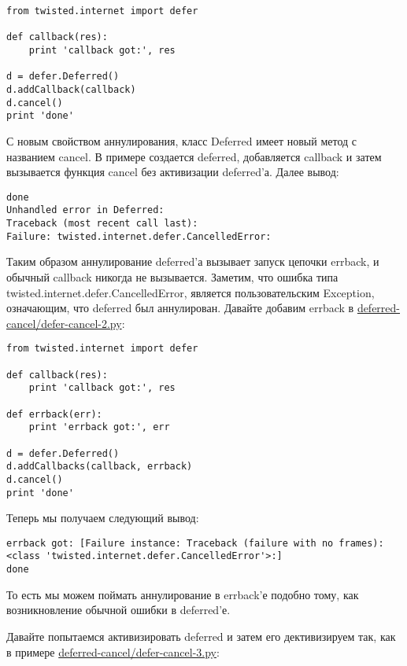  \begin{verbatim}
from twisted.internet import defer

def callback(res):
    print 'callback got:', res

d = defer.Deferred()
d.addCallback(callback)
d.cancel()
print 'done'
\end{verbatim} 


С новым свойством аннулирования, класс Deferred имеет новый 
метод с названием cancel. В примере создается deferred, 
добавляется callback и затем вызывается функция cancel без 
активизации deferred'а.  Далее вывод:

 \begin{verbatim}
done
Unhandled error in Deferred:
Traceback (most recent call last):
Failure: twisted.internet.defer.CancelledError:
\end{verbatim} 


Таким образом аннулирование deferred'а вызывает запуск 
цепочки errback, и обычный callback никогда не вызывается. 
Заметим, что ошибка типа twisted.internet.defer.CancelledError, 
является пользовательским Exception, означающим, что deferred 
был аннулирован. Давайте добавим errback в 
\href{http://github.com/jdavisp3/twisted-intro/blob/master/deferred-cancel/defer-cancel-2.py#L1}{deferred-cancel/defer-cancel-2.py}:

 \begin{verbatim}
from twisted.internet import defer

def callback(res):
    print 'callback got:', res

def errback(err):
    print 'errback got:', err

d = defer.Deferred()
d.addCallbacks(callback, errback)
d.cancel()
print 'done'
\end{verbatim} 

Теперь мы получаем следующий вывод:

 \begin{verbatim}
errback got: [Failure instance: Traceback (failure with no frames): 
<class 'twisted.internet.defer.CancelledError'>:]
done
\end{verbatim} 

То есть мы можем поймать аннулирование в errback'е подобно тому, как 
возникновление обычной ошибки в deferred'е.


Давайте попытаемся активизировать deferred и 
затем его дективизируем так, как в примере 
\href{http://github.com/jdavisp3/twisted-intro/blob/master/deferred-cancel/defer-cancel-3.py#L1}{deferred-cancel/defer-cancel-3.py}:


